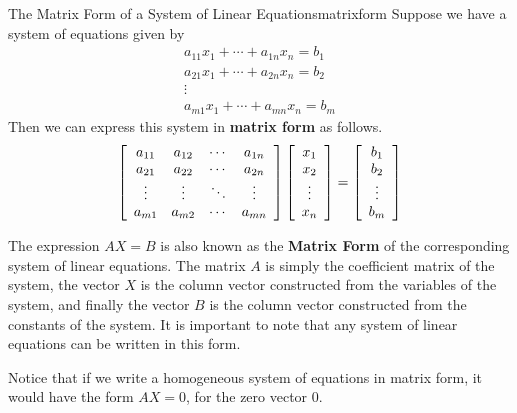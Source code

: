 \begin{definition}{The Matrix Form of a System of Linear Equations}{matrixform}
Suppose we have a system of equations given by
\begin{equation*}
\begin{array}{c}
a_{11}x_{1}+\cdots +a_{1n}x_{n}=b_{1} \\
a_{21}x_{1}+ \cdots + a_{2n}x_{n} = b_{2} \\
\vdots \\
a_{m1}x_{1}+\cdots +a_{mn}x_{n}=b_{m}
\end{array}
\end{equation*}
Then we can express this system in \textbf{matrix form} as follows.
\begin{equation*}
\left[
\begin{array}{cccc}
a_{11} & a_{12} & \cdots & a_{1n} \\
a_{21} & a_{22} & \cdots & a_{2n} \\
\vdots & \vdots & \ddots & \vdots \\
a_{m1} & a_{m2} & \cdots & a_{mn}
\end{array}
\right]
\left[
\begin{array}{c}
x_{1} \\
x_{2} \\
\vdots \\
x_{n}
\end{array}
\right]
=
\left[
\begin{array}{c}
b_{1}\\
b_{2}\\
\vdots \\
b_{m}
\end{array}
\right]
\end{equation*}
 
\end{definition}

The expression $AX=B$ is also known as the \textbf{Matrix Form} of the
corresponding system of linear equations. The
matrix $A$ is simply the coefficient matrix of the system, the vector
$X$ is the column vector constructed from the variables of the system,
and finally the vector $B$ is the column vector constructed from the constants
of the system.  It is important to note that any system of linear
equations can be written in this form.

Notice that if we write a homogeneous system of equations in matrix form, it would have the form
$AX=0$, for the zero vector $0$.

